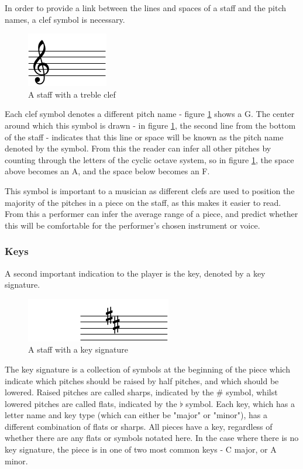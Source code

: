 In order to provide a link between the lines and spaces of a staff and the pitch names, a clef symbol is necessary.
\begin{figure}[h]
    \centering
        \includegraphics{clef-crop.pdf}
    \caption{A staff with a treble clef}
    \label{fig:clef}
\end{figure}

Each clef symbol denotes a different pitch name - figure \ref{fig:clef} shows a G. The center around which this symbol is drawn - in figure \ref{fig:clef}, the second line from the bottom of the staff - indicates that this line or space will be known as the pitch name denoted by the symbol. From this the reader can infer all other pitches by counting through the letters of the cyclic octave system, so in figure \ref{fig:clef}, the space above becomes an A, and the space below becomes an F.

This symbol is important to a musician as different clefs are used to position the majority of the pitches in a piece on the staff, as this makes it easier to read. From this a performer can infer the average range of a piece, and predict whether this will be comfortable for the performer's chosen instrument or voice.

\subsubsection{Keys}
A second important indication to the player is the key, denoted by a key signature.
\begin{figure}[h]
    \centering
        \includegraphics{key-crop.pdf}
    \caption{A staff with a key signature}
    \label{fig:key}
\end{figure}

The key signature is a collection of symbols at the beginning of the piece which indicate which pitches should be raised by half pitches, and which should be lowered. Raised pitches are called sharps, indicated by the \# symbol, whilst lowered pitches are called flats, indicated by the $\flat$ symbol. Each key, which has a letter name and key type (which can either be "major" or "minor"), has a different combination of flats or sharps. All pieces have a key, regardless of whether there are any flats or symbols notated here. In the case where there is no key signature, the piece is in one of two most common keys - C major, or A minor.


